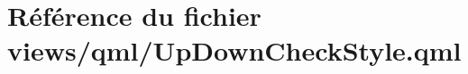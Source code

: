 \hypertarget{UpDownCheckStyle_8qml}{\section{Référence du fichier views/qml/\-Up\-Down\-Check\-Style.qml}
\label{UpDownCheckStyle_8qml}
}
